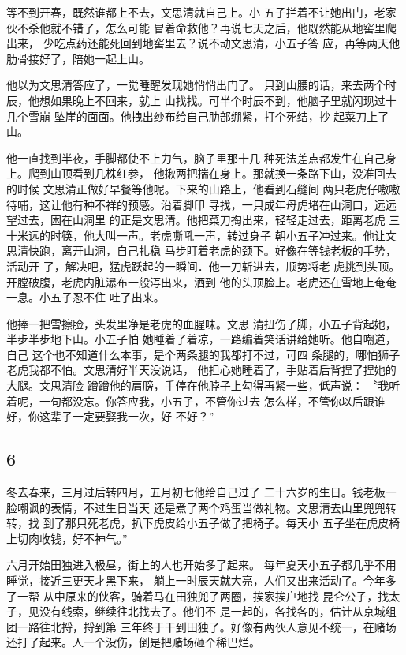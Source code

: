 等不到开春，既然谁都上不去，文思清就自己上。小
五子拦着不让她出门，老家伙不杀他就不错了，怎么可能
冒着命救他？再说七天之后，他既然能从地窖里爬出来，
少吃点药还能死回到地窖里去？说不动文思清，小五子答
应，再等两天他肋骨接好了，陪她一起上山。

他以为文思清答应了，一觉睡醒发现她悄悄出门了。
只到山腰的话，来去两个时辰，他想如果晚上不回来，就上
山找找。可半个时辰不到，他脑子里就闪现过十几个雪崩
坠崖的面面。他拽出纱布给自己肋部绷紧，打个死结，抄
起菜刀上了山。

他一直找到半夜，手脚都使不上力气，脑子里那十几
种死法差点都发生在自己身上。爬到山顶看到几株红参，
他揪两把揣在身上。那就换一条路下山，没准回去的时候
文思清正做好早餐等他呢。下来的山路上，他看到石缝间
两只老虎仔嗷嗷待哺，这让他有种不祥的预感。沿着脚印
寻找，一只成年母虎堵在山洞口，远远望过去，困在山洞里
的正是文思清。他把菜刀掏出来，轻轻走过去，距离老虎
三十米远的时筷，他大叫一声。老虎嘶吼一声，转过身子
朝小五子冲过来。他让文思清快跑，离开山洞，自己扎稳
马步盯着老虎的颈下。好像在等钱老板的手势，活动开
了，解决吧，猛虎跃起的一瞬间．他一刀斩进去，顺势将老
虎挑到头顶。开膛破腹，老虎内脏瀑布一般泻出来，洒到
他的头顶脸上。老虎还在雪地上奄奄一息。小五子忍不住
吐了出来。

他捧一把雪擦脸，头发里净是老虎的血腥味。文思
清扭伤了脚，小五子背起她，半步半步地下山。小五子怕
她睡着了着凉，一路编着笑话讲给她听。他自嘲道，自己
这个也不知道什么本事，是个两条腿的我都打不过，可四
条腿的，哪怕狮子老虎我都不怕。文思清好半天没说话，
他担心她睡着了，手贴着后背捏了捏她的大腿。文思清脸
蹭蹭他的肩膀，手停在他脖子上勾得再紧一些，低声说：
〝我听着呢，一句都没忘。你答应我，小五子，不管你过去
怎么样，不管你以后跟谁好，你这辈子一定要娶我一次，好
不好？”
\newline

{\centering\subsection{6}}

冬去春来，三月过后转四月，五月初七他给自己过了
二十六岁的生日。钱老板一脸嘲讽的表情，不过生日当天
还是煮了两个鸡蛋当做礼物。文思清去山里兜兜转转，找
到了那只死老虎，扒下虎皮给小五子做了把椅子。每天小
五子坐在虎皮椅上切肉收钱，好不神气。”

六月开始田独进入极昼，街上的人也开始多了起来。
每年夏天小五子都几乎不用睡觉，接近三更天才黑下来，
躺上一时辰天就大亮，人们又出来活动了。今年多了一帮
从中原来的侠客，骑着马在田独兜了两圈，挨家挨户地找
昆仑公子，找太子，见没有线索，继续往北找去了。他们不
是一起的，各找各的，估计从京城组团一路往北捋，捋到第
三年终于干到田独了。好像有两伙人意见不统一，在赌场
还打了起来。人一个没伤，倒是把赌场砸个稀巴烂。

